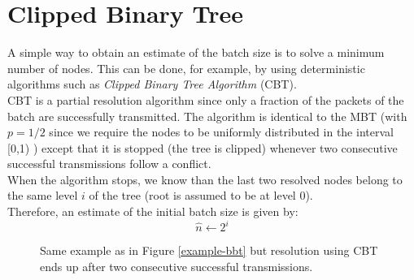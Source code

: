 \documentclass[12pt,a4paper]{report}
\begin{document}
\section{Clipped Binary Tree}
\label{cbt-estimation}
A simple way to obtain an estimate of the batch size is to solve a minimum number of nodes. This can be done, for example, by using deterministic algorithms such as \emph{Clipped Binary Tree Algorithm} (CBT).\\
CBT is a partial resolution algorithm since only a fraction of the packets of the batch are successfully transmitted.
The algorithm is identical to the MBT (with $p=1/2$ since we require the nodes to be uniformly distributed in the interval [0,1) ) except that it is stopped (the tree is clipped) whenever two consecutive successful transmissions follow a conflict.\\
When the algorithm stops, we know than the last two resolved nodes belong to the same level $i$ of the tree (root is assumed to be at level 0).\\
Therefore, an estimate of the initial batch size is given by:
\begin{equation}
\hat{n}\gets2^{i}
\end{equation}

\begin{figure}[H]
\centering
{}
\caption[\emph{CBT}: example]{ Same example as in Figure \ref{example-bbt} but resolution using CBT ends up after two consecutive successful transmissions.}
\end{figure}
\end{document}

